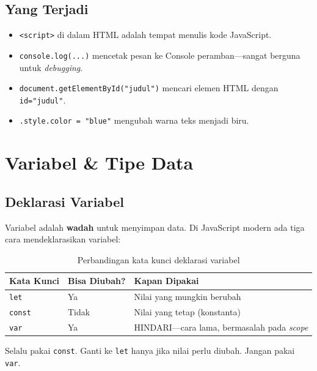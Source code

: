 \subsection{Yang Terjadi}
\begin{itemize}
  \item \texttt{<script>} di dalam HTML adalah tempat menulis kode JavaScript.
  \item \texttt{console.log(...)} mencetak pesan ke Console peramban---sangat berguna untuk \emph{debugging}.
  \item \texttt{document.getElementById("judul")} mencari elemen HTML dengan \texttt{id="judul"}.
  \item \texttt{.style.color = "blue"} mengubah warna teks menjadi biru.
\end{itemize}

\section{Variabel \& Tipe Data}
\label{sec:10-variabel}

\subsection{Deklarasi Variabel}

Variabel adalah \textbf{wadah} untuk menyimpan data. Di JavaScript modern ada tiga cara mendeklarasikan variabel:

\begin{table}[htbp]
\centering
\caption{Perbandingan kata kunci deklarasi variabel}
\label{tab:10-variabel}
\begin{tabular}{lll}
\toprule
\textbf{Kata Kunci} & \textbf{Bisa Diubah?} & \textbf{Kapan Dipakai} \\
\midrule
\texttt{let}    & Ya   & Nilai yang mungkin berubah \\
\texttt{const}  & Tidak & Nilai yang tetap (konstanta) \\
\texttt{var}    & Ya   & HINDARI---cara lama, bermasalah pada \emph{scope} \\
\bottomrule
\end{tabular}
\end{table}

\begin{tip}
Selalu pakai \texttt{const}. Ganti ke \texttt{let} hanya jika nilai perlu diubah. Jangan pakai \texttt{var}.
\end{tip}

